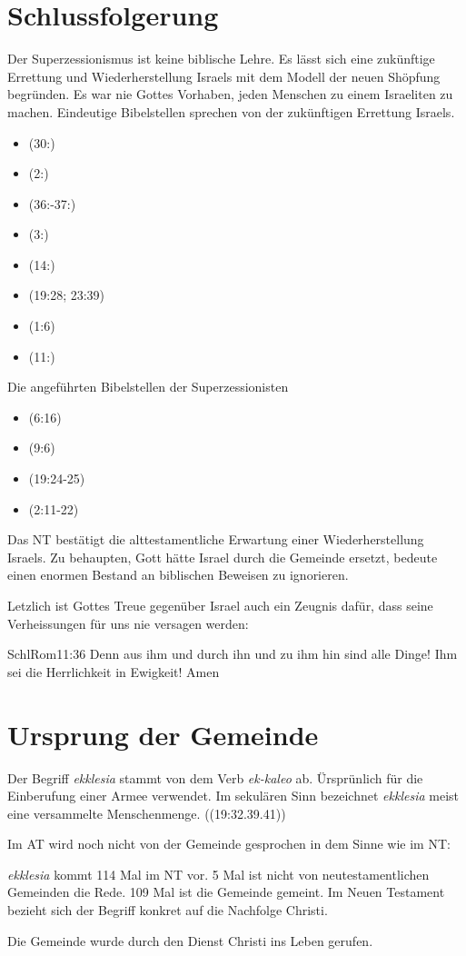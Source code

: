 \documentclass{../../inc/mybib}
\begin{document}
\section{Schlussfolgerung}
Der Superzessionismus ist keine biblische Lehre. Es lässt sich eine zukünftige Errettung und Wiederherstellung Israels mit dem Modell der neuen Shöpfung begründen. Es war nie Gottes Vorhaben, jeden Menschen zu einem Israeliten zu machen. Eindeutige Bibelstellen sprechen von der zukünftigen Errettung Israels.
\begin{itemize}
    \item {}(30:)
    \item {}(2:)
    \item {}(36:-37:)
    \item {}(3:)
    \item {}(14:)
    \item {}(19:28; 23:39)
    \item {}(1:6)
    \item {}(11:)
\end{itemize}
Die angeführten Bibelstellen der Superzessionisten
\begin{itemize}
    \item {}(6:16)
    \item {}(9:6)
    \item {}(19:24-25)
    \item {}(2:11-22)
\end{itemize}
Das NT bestätigt die alttestamentliche Erwartung einer Wiederherstellung Israels. Zu behaupten, Gott hätte Israel durch die Gemeinde ersetzt, bedeute einen enormen Bestand an biblischen Beweisen zu ignorieren.

Letzlich ist Gottes Treue gegenüber Israel auch ein Zeugnis dafür, dass seine Verheissungen für uns nie versagen werden:
\begin{bibelbox}{Schl}{Rom}{11:36}
    Denn aus ihm und durch ihn und zu ihm hin sind alle Dinge! Ihm sei die Herrlichkeit in Ewigkeit! Amen
\end{bibelbox}
\section{Ursprung der Gemeinde}
Der Begriff \textit{ekklesia} stammt von dem Verb \textit{ek-kaleo} ab. Ürsprünlich für die Einberufung einer Armee verwendet. Im sekulären Sinn bezeichnet \textit{ekklesia} meist eine versammelte Menschenmenge. ((19:32.39.41))

Im AT wird noch nicht von der Gemeinde gesprochen in dem Sinne wie im NT:

\textit{ekklesia} kommt 114 Mal im NT vor. 5 Mal ist nicht von neutestamentlichen Gemeinden die Rede. 109 Mal ist die Gemeinde gemeint. Im Neuen Testament bezieht sich der Begriff konkret auf die Nachfolge Christi.

Die Gemeinde wurde durch den Dienst Christi ins Leben gerufen.
\end{document}
